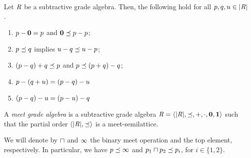 \begin{proposition} \label{prop:subtractive-alg} 
Let $\mathit{R}$ be a subtractive grade algebra. 
Then, the following hold for all $p,q,u\in|\mathit{R}|$.
\begin{enumerate}
\item\label{prop:subtractive-alg:1}  $p-\mathbf{0} = p$  and $\mathbf{0}\preceq p-p$;
\item\label{prop:subtractive-alg:2}  $p\preceq q$ implies $u-q\preceq u-p$; 
\item \label{prop:subtractive-alg:3} $(p-q)+q\preceq p$ and $p\preceq(p+q)-q$; 
\item\label{prop:subtractive-alg:4}  $p-(q+u) = (p-q)-u$ 
\item\label{prop:subtractive-alg:5}  $(p-q)-u = (p-u)-q$ 
\end{enumerate}
\end{proposition}

\begin{definition}
A \emph{ meet  grade algebra} is a subtractive grade algebra 
$\mathit{R} = \langle |\mathit{R}|,\preceq,+,{\cdot},\mathbf{0},\mathbf{1} \rangle$ such that 
the partial order $\langle |\mathit{R}|,\preceq \rangle$ is a meet-semilattice. 
\end{definition} 
% 
We will denote by $\sqcap$ and $\infty$ the binary meet operation and the top element, respectively. 
In particular, we have $p\preceq\infty$ and $p_1\sqcap p_2\preceq p_i$, for $i \in \{1,2\}$. 

